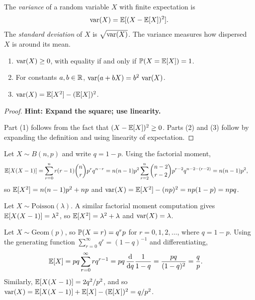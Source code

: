 \documentclass[a4paper]{article}
\begin{document}
\begin{defi}
  The \emph{variance} of a random variable $X$ with finite expectation is
  \[
    \var(X) = \E[(X - \E[X])^2].
  \]
  The \emph{standard deviation} of $X$ is $\sqrt{\var(X)}$. The variance measures how dispersed $X$ is around its mean.
\end{defi}

\begin{prop}\leavevmode
  \begin{enumerate}
    \item $\var(X) \geq 0$, with equality if and only if $\P(X = \E[X]) = 1$.
    \item For constants $a, b \in \R$, $\var(a + bX) = b^2\, \var(X)$.
    \item $\var(X) = \E[X^2] - (\E[X])^2$.
  \end{enumerate}
\end{prop}

\begin{proof}
  \textbf{Hint: Expand the square; use linearity.}

  Part (1) follows from the fact that $(X - \E[X])^2 \geq 0$. Parts (2) and (3) follow by expanding the definition and using linearity of expectation.
\end{proof}

\begin{eg}
  Let $X\sim B(n, p)$ and write $q = 1 - p$. Using the factorial moment,
  \begin{align*}
    \E[X(X - 1)] &= \sum_{r = 0}^n r(r - 1)\binom{n}{r} p^r q^{n - r} = n(n - 1)p^2\sum_{r = 2}^n \binom{n - 2}{r - 2} p^{r - 2}q^{n - 2 - (r - 2)} = n(n - 1)p^2,
  \end{align*}
  so $\E[X^2] = n(n - 1)p^2 + np$ and $\var(X) = \E[X^2] - (np)^2 = np(1 - p) = npq$.
\end{eg}

\begin{eg}
  Let $X\sim \mathrm{Poisson}(\lambda)$. A similar factorial moment computation gives $\E[X(X-1)] = \lambda^2$, so $\E[X^2] = \lambda^2 + \lambda$ and $\var(X) = \lambda$.
\end{eg}

\begin{eg}
  Let $X\sim \mathrm{Geom}(p)$, so $\P(X = r) = q^r p$ for $r= 0, 1, 2, \dotsc$, where $q = 1 - p$. Using the generating function $\sum_{r=0}^{\infty} q^r = (1 - q)^{-1}$ and differentiating,
  \begin{align*}
    \E[X] &= pq\sum_{r=0}^\infty rq^{r - 1} = pq\,\frac{\d }{\d q}\frac{1}{1 - q} = \frac{pq}{(1 - q)^2} = \frac{q}{p}.
  \end{align*}
  Similarly, $\E[X(X - 1)] = 2q^2/p^2$, and so $\var(X) = \E[X(X-1)] + \E[X] - (\E[X])^2 = q/p^2$.
\end{eg}
\end{document}
